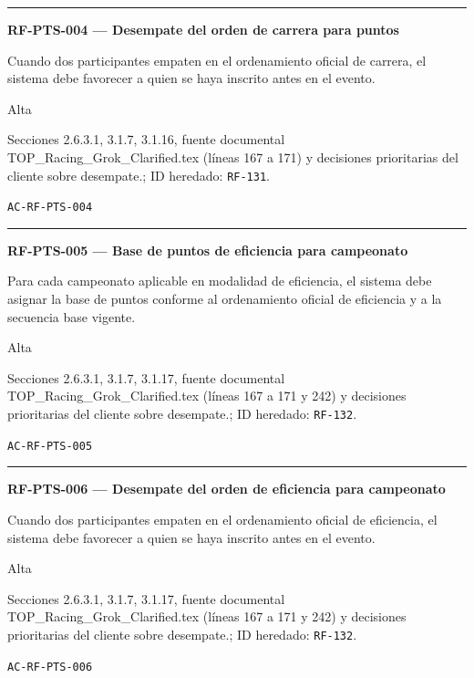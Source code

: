\documentclass[10pt,letterpaper]{article}
\begin{document}
\vspace{0.25em}\hrule\vspace{0.65em}
\noindent\textbf{RF-PTS-004 --- Desempate del orden de carrera para puntos}\par
\begin{description}[style=nextline,leftmargin=3.15cm,labelwidth=2.8cm,font=\normalfont\bfseries]
\item[Obligación] Cuando dos participantes empaten en el ordenamiento oficial de carrera, el sistema debe favorecer a quien se haya inscrito antes en el evento.
\item[Prioridad] Alta
\item[Procedencia] Secciones 2.6.3.1, 3.1.7, 3.1.16, fuente documental TOP\_Racing\_Grok\_Clarified.tex (líneas 167 a 171) y decisiones prioritarias del cliente sobre desempate.; ID heredado: \texttt{RF-131}.
\item[Verificación] \texttt{AC-RF-PTS-004}
\end{description}
\vspace{0.25em}\hrule\vspace{0.65em}
\noindent\textbf{RF-PTS-005 --- Base de puntos de eficiencia para campeonato}\par
\begin{description}[style=nextline,leftmargin=3.15cm,labelwidth=2.8cm,font=\normalfont\bfseries]
\item[Obligación] Para cada campeonato aplicable en modalidad de eficiencia, el sistema debe asignar la base de puntos conforme al ordenamiento oficial de eficiencia y a la secuencia base vigente.
\item[Prioridad] Alta
\item[Procedencia] Secciones 2.6.3.1, 3.1.7, 3.1.17, fuente documental TOP\_Racing\_Grok\_Clarified.tex (líneas 167 a 171 y 242) y decisiones prioritarias del cliente sobre desempate.; ID heredado: \texttt{RF-132}.
\item[Verificación] \texttt{AC-RF-PTS-005}
\end{description}
\vspace{0.25em}\hrule\vspace{0.65em}
\noindent\textbf{RF-PTS-006 --- Desempate del orden de eficiencia para campeonato}\par
\begin{description}[style=nextline,leftmargin=3.15cm,labelwidth=2.8cm,font=\normalfont\bfseries]
\item[Obligación] Cuando dos participantes empaten en el ordenamiento oficial de eficiencia, el sistema debe favorecer a quien se haya inscrito antes en el evento.
\item[Prioridad] Alta
\item[Procedencia] Secciones 2.6.3.1, 3.1.7, 3.1.17, fuente documental TOP\_Racing\_Grok\_Clarified.tex (líneas 167 a 171 y 242) y decisiones prioritarias del cliente sobre desempate.; ID heredado: \texttt{RF-132}.
\item[Verificación] \texttt{AC-RF-PTS-006}
\end{description}
\end{document}
